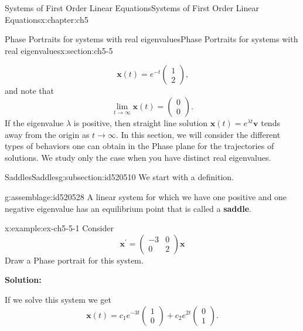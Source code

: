 \documentclass[oneside,10pt,]{book}
\newcommand{\terminology}[1]{\textbf{#1}}
\numberwithin{equation}{section}
\numberwithin{equation}{section}
\newcommand{\amp}{&}
\begin{document}
\begin{chapterptx}{Systems of First Order Linear Equations}{}{Systems of First Order Linear Equations}{}{}{x:chapter:ch5}
\begin{sectionptx}{Phase Portraits for systems with real eigenvalues}{}{Phase Portraits for systems with real eigenvalues}{}{}{x:section:ch5-5}
\begin{introduction}{}
\begin{equation*}
\mathbf{x}(t)=e^{-t}\left(\begin{array}{c}
1\\
2
\end{array}\right)\text{,}
\end{equation*}
and note that%
\begin{equation*}
\lim_{t\to\infty}\mathbf{x}(t)=\left(\begin{array}{c}
0\\
0
\end{array}\right).
\end{equation*}
If the eigenvalue \(\lambda\) is positive, then straight line solution \(\mathbf{x}(t)=e^{\lambda t}\mathbf{v}\) tends away from the origin as \(t\to\infty\). In this section, we will consider the different types of behaviors one can obtain in the Phase plane for the trajectories of solutions. We study only the case when you have distinct real eigenvalues.%
\end{introduction}%
%
%
\typeout{************************************************}
\typeout{************************************************}
%
\begin{subsectionptx}{Saddles}{}{Saddles}{}{}{g:subsection:id520510}
We start with a definition.%
\begin{assemblage}{}{g:assemblage:id520528}%
A linear system for which we have one positive and one negative eigenvalue has an equilibrium point that is called a \terminology{saddle}.%
\end{assemblage}
\begin{example}{}{x:example:ex-ch5-5-1}%
Consider%
\begin{equation*}
\boldsymbol{x}^{\prime}=\left(\begin{array}{cc}
-3 \amp 0\\
0 \amp 2
\end{array}\right)\mathbf{x}
\end{equation*}
Draw a Phase portrait for this system.%
\par
\terminology{Solution:}%
\par
If we solve this system we get%
\begin{equation*}
\mathbf{x}(t)=c_{1}e^{-3t}\left(\begin{array}{c}
1\\
0
\end{array}\right)+c_{2}e^{2t}\left(\begin{array}{c}
0\\
1
\end{array}\right).

\end{equation*}
\end{example}
\end{subsectionptx}
\end{sectionptx}
\end{chapterptx}
\end{document}

